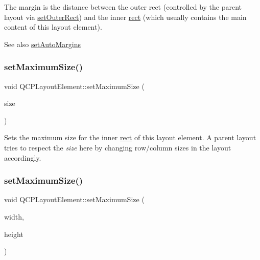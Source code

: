 The margin is the distance between the outer rect (controlled by the parent layout via \hyperlink{class_q_c_p_layout_element_a38975ea13e36de8e53391ce41d94bc0f}{set\+Outer\+Rect}) and the inner \hyperlink{class_q_c_p_layout_element_a208effccfe2cca4a0eaf9393e60f2dd4}{rect} (which usually contains the main content of this layout element).

\begin{DoxySeeAlso}{See also}
\hyperlink{class_q_c_p_layout_element_accfda49994e3e6d51ed14504abf9d27d}{set\+Auto\+Margins} 
\end{DoxySeeAlso}
\mbox{\label{class_q_c_p_layout_element_a74eb5280a737ab44833d506db65efd95}} 
\subsubsection{\texorpdfstring{set\+Maximum\+Size()}{setMaximumSize()}\hspace{0.1cm}{\footnotesize\ttfamily [1/2]}}
{\footnotesize\ttfamily void Q\+C\+P\+Layout\+Element\+::set\+Maximum\+Size (\begin{DoxyParamCaption}\item[{const Q\+Size \&}]{size }\end{DoxyParamCaption})}

Sets the maximum size for the inner \hyperlink{class_q_c_p_layout_element_a208effccfe2cca4a0eaf9393e60f2dd4}{rect} of this layout element. A parent layout tries to respect the {\itshape size} here by changing row/column sizes in the layout accordingly. \mbox{\label{class_q_c_p_layout_element_a03e0e9c48f230217c529b0819f832d84}} 
\subsubsection{\texorpdfstring{set\+Maximum\+Size()}{setMaximumSize()}\hspace{0.1cm}{\footnotesize\ttfamily [2/2]}}
{\footnotesize\ttfamily void Q\+C\+P\+Layout\+Element\+::set\+Maximum\+Size (\begin{DoxyParamCaption}\item[{int}]{width,  }\item[{int}]{height }\end{DoxyParamCaption})}

